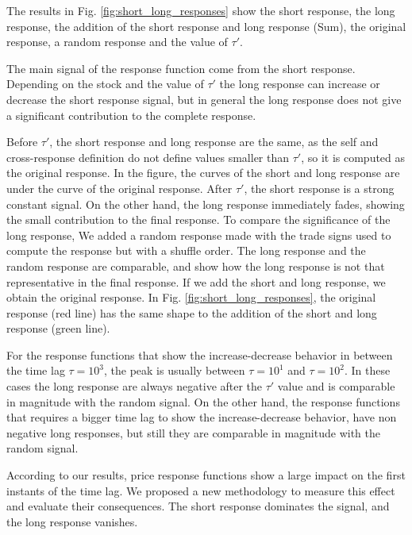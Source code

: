 The results in Fig. \ref{fig:short_long_responses} show the short response, the
long response, the addition of the short response and long response (Sum), the
original response, a random response and the value of $\tau'$.

The main signal of the response function come from the short response.
Depending on the stock and the value of $\tau'$ the long response can increase
or decrease the short response signal, but in general the long response does
not give a significant contribution to the complete response.

Before $\tau'$, the short response and long response are the same, as the self
and cross-response definition do not define values smaller than $\tau '$, so it
is computed as the original response. In the figure, the curves of the short
and long response are under the curve of the original response. After $\tau'$,
the short response is a strong constant signal. On the other hand, the long
response immediately fades, showing the small contribution to the final
response. To compare the significance of the long response, We added a random
response made with the trade signs used to compute the response but with a
shuffle order. The long response and the random response are comparable, and
show how the long response is not that representative in the final response.
If we add the short and long response, we obtain the original response. In Fig.
\ref{fig:short_long_responses}, the original response (red line) has the same
shape to the addition of the short and long response (green line).

For the response functions that show the increase-decrease behavior in between
the time lag $\tau = 10^{3}$, the peak is usually between $\tau = 10^{1}$ and
$\tau = 10^{2}$. In these cases the long response are always negative after the
$\tau'$ value and is comparable in magnitude with the random signal.
On the other hand, the response functions that requires a bigger time lag to
show the increase-decrease behavior, have non negative long responses, but
still they are comparable in magnitude with the random signal.

According to our results, price response functions show a large impact on the
first instants of the time lag. We proposed a new methodology to measure this
effect and evaluate their consequences. The short response dominates the
signal, and the long response vanishes.